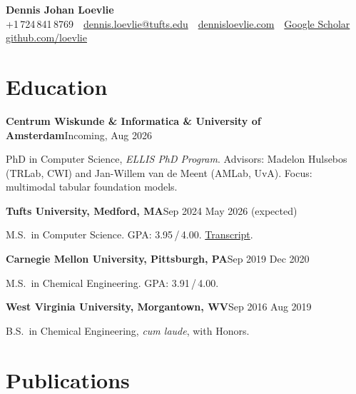 \documentclass[10pt,letterpaper]{article}
\newcommand{\lffiguresnow}{\figureversion{lf}}
\newcommand{\lffiguresnow}{\addfontfeatures{Numbers=Lining}}
\newcommand{\sansfam}{\sffamily}
\newcommand{\datestamp}[1]{{\sansfam\footnotesize\color{meta}\lffiguresnow #1}}
\newcommand{\role}[2]{%
  \filbreak%
  \par\vspace{1pt}%
  \noindent\textbf{#1}\hfill\datestamp{#2}\par\nopagebreak}
\begin{document}
\thispagestyle{cvfirst}

\begin{center}
{\sansfam\fontsize{22pt}{26pt}\selectfont\bfseries\color{accent} Dennis Johan Loevlie}\\[2pt]
{\sansfam\footnotesize\color{meta}%
+1\,724\,841\,8769 \,\textperiodcentered\,
\href{mailto:dennis.loevlie@tufts.edu}{dennis.loevlie@tufts.edu} \,\textperiodcentered\,
\href{https://www.dennisloevlie.com}{dennisloevlie.com} \,\textperiodcentered\,
\href{https://scholar.google.com/citations?user=oGkEIYkAAAAJ}{Google Scholar} \,\textperiodcentered\,
\href{https://github.com/loevlie}{github.com/loevlie}}
\end{center}
\vspace{-4pt}{\color{rule}\rule{\linewidth}{0.5pt}}

\section{Education}

\role{Centrum Wiskunde \& Informatica \& University of Amsterdam}{Incoming, Aug 2026 \textendash{}}
PhD in Computer Science, \textit{ELLIS PhD Program}. Advisors: Madelon Hulsebos (TRLab, CWI) and Jan-Willem van de Meent (AMLab, UvA). Focus: multimodal tabular foundation models.

\role{Tufts University, Medford, MA}{Sep 2024 \textendash{} May 2026 (expected)}
M.S.\ in Computer Science. GPA: 3.95\,/\,4.00. \href{https://www.loevliedl.com/static/Portfolio/PDF/SSR_TSRPT.pdf}{Transcript}.

\role{Carnegie Mellon University, Pittsburgh, PA}{Sep 2019 \textendash{} Dec 2020}
M.S.\ in Chemical Engineering. GPA: 3.91\,/\,4.00.

\role{West Virginia University, Morgantown, WV}{Sep 2016 \textendash{} Aug 2019}
B.S.\ in Chemical Engineering, \textit{cum laude}, with Honors.

\section{Publications}
\end{document}
